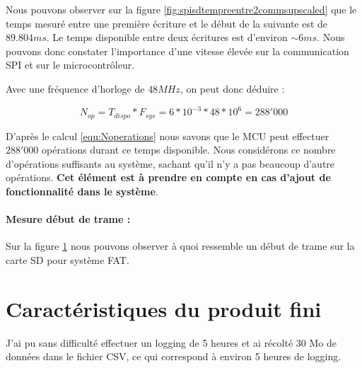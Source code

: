 {	Nous pouvons observer sur la figure \ref{fig:spisdtempreentre2commsupscaled} que le temps mesuré entre une première écriture et le début de la suivante est de $89.804 ms$. Le temps disponible entre deux écritures est d'environ $\sim6ms$.
	Nous pouvons donc constater l'importance d'une vitesse élevée sur la communication SPI et sur le microcontrôleur.
	
	Avec une fréquence d'horloge de $48MHz$, on peut donc déduire :
	
	\begin{equation} 
		\label{equ:Noperations}
		N_{op} = T_{dispo} * F_{sys} = 6*10^{-3} * 48*10^{6} = 288'000 
	\end{equation}
	
	D'après le calcul \ref{equ:Noperations} nous savons que le MCU peut effectuer $288'000$ opérations durant ce temps disponible. Nous considérons ce nombre d'opérations suffisants au système, sachant qu'il n'y a pas beaucoup d'autre opérations. \textbf{Cet élément est à prendre en compte en cas d'ajout de fonctionnalité dans le système}.
	
	\paragraph{Mesure début de trame :} Sur la figure \ref{} nous pouvons observer à quoi ressemble un début de trame sur la carte SD pour système FAT.
	
	
	
	
}

\section{Caractéristiques du produit fini}

J'ai pu sans difficulté effectuer un logging de 5 heures et ai récolté 30 Mo de données dans le fichier CSV, ce qui correspond à environ 5 heures de logging.